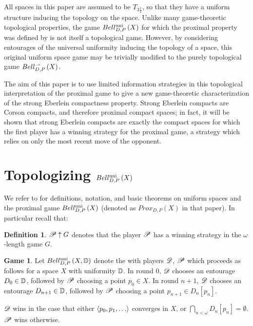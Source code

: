 \documentclass{amsart}
\theoremstyle{definition}
\newtheorem{definition}[theorem]{Definition}
\newtheorem{game}[theorem]{Game}
\begin{document}
  All spaces in this paper are assumed to be \(T_{3\frac{1}{2}}\), so that they
  have a uniform structure inducing the topology on the space.
  Unlike many game-theoretic topological properties, the game
  \(Bell_{D,P}^{\textrm{uni}}\left({X}\right)\)
  for which the proximal property was defined by is not itself a topological
  game. However, by considering entourages of the universal uniformity
  inducing the topology of a space, this original uniform space game may be
  trivially modified to the purely topological game \(Bell_{D,P}^{\rightharpoonup}\left({X}\right)\).

  The aim of this paper is to use limited information strategies in
  this topological interpretation of the
  proximal game to give a new game-theoretic characterization of the
  strong Eberlein compactness property. Strong Eberlein compacts are Corson
  compacts, and therefore proximal compact spaces; in fact, it will be shown
  that strong Eberlein compacts are exactly the compact spaces for which the
  first player has a  winning strategy for the proximal game,
  a strategy which relies on only the most recent move of the opponent.


\section{Topologizing \(Bell_{D,P}^{\textrm{uni}}\left({X}\right)\)}

  We refer to \cite{MR3227201} for definitions, notation, and basic theorems on
  uniform spaces and the proximal game \(Bell_{D,P}^{\textrm{uni}}\left({X}\right)\) (denoted as
  \(Prox_{D,P}(X)\) in that paper). In particular recall that:

  \begin{definition}
    \(\mathscr{P} \uparrow G\) denotes that the player \(\mathscr{P}\) has a winning strategy
    in the \(\omega\)-length game \(G\).
  \end{definition}

  \begin{game}
    Let \(Bell_{D,P}^{\textrm{uni}}\left({X,\mathbb{D}}\right)\) denote the
     with
    players \(\mathscr{D}\), \(\mathscr{P}\) which proceeds as follows for
    a space \(X\) with uniformity \(\mathbb{D}\). In round \(0\),
    \(\mathscr{D}\) chooses an entourage \(D_0\in\mathbb{D}\), followed by \(\mathscr{P}\)
    choosing a point \(p_0\in X\). In round \(n+1\),
    \(\mathscr{D}\) chooses an entourage
    \(D_{n+1}\in\mathbb{D}\),
    followed by \(\mathscr{P}\) choosing a point \(p_{n+1}\in D_n[p_n]\).

    \(\mathscr{D}\) wins in the case that either
    \(\<p_0,p_1,\dots\>\) converges in \(X\),
    or \(\bigcap_{n<\omega}D_n[p_n] = \emptyset\). \(\mathscr{P}\) wins otherwise.
  \end{game}
\end{document}
